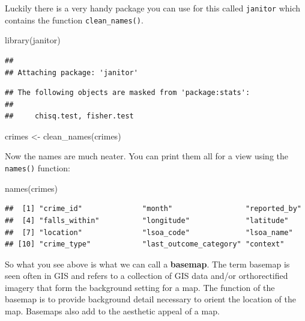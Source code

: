 \documentclass[
]{book}
\newenvironment{Shaded}{\begin{snugshade}}{\end{snugshade}}
\newcommand{\FunctionTok}[1]{\textcolor[rgb]{0.00,0.00,0.00}{#1}}
\newcommand{\NormalTok}[1]{#1}
\newcommand{\OtherTok}[1]{\textcolor[rgb]{0.56,0.35,0.01}{#1}}
\begin{document}
Luckily there is a very handy package you can use for this called \texttt{janitor} which contains the function \texttt{clean\_names()}.

\begin{Shaded}
\begin{Highlighting}[]
\FunctionTok{library}\NormalTok{(janitor)}
\end{Highlighting}
\end{Shaded}

\begin{verbatim}
## 
## Attaching package: 'janitor'
\end{verbatim}

\begin{verbatim}
## The following objects are masked from 'package:stats':
## 
##     chisq.test, fisher.test
\end{verbatim}

\begin{Shaded}
\begin{Highlighting}[]
\NormalTok{crimes }\OtherTok{\textless{}{-}} \FunctionTok{clean\_names}\NormalTok{(crimes)}
\end{Highlighting}
\end{Shaded}

Now the names are much neater. You can print them all for a view using the \texttt{names()} function:

\begin{Shaded}
\begin{Highlighting}[]
\FunctionTok{names}\NormalTok{(crimes)}
\end{Highlighting}
\end{Shaded}

\begin{verbatim}
##  [1] "crime_id"              "month"                 "reported_by"          
##  [4] "falls_within"          "longitude"             "latitude"             
##  [7] "location"              "lsoa_code"             "lsoa_name"            
## [10] "crime_type"            "last_outcome_category" "context"
\end{verbatim}

So what you see above is what we can call a \textbf{basemap}. The term basemap is seen often in GIS and refers to a collection of GIS data and/or orthorectified imagery that form the background setting for a map. The function of the basemap is to provide background detail necessary to orient the location of the map. Basemaps also add to the aesthetic appeal of a map.
\end{document}
